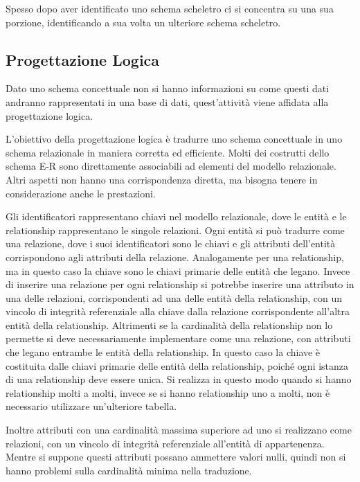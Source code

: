 \documentclass{article}
\numberwithin{equation}{subsection}
\begin{document}
Spesso dopo aver identificato uno schema scheletro ci si concentra su una sua porzione, identificando a sua volta un ulteriore schema scheletro. 

\subsection{Progettazione Logica}

Dato uno schema concettuale non si hanno informazioni su come questi dati andranno rappresentati in una base di dati, quest'attività viene affidata alla progettazione logica. 

L'obiettivo della progettazione logica è tradurre uno schema concettuale in uno schema relazionale in maniera corretta ed efficiente. 
Molti dei costrutti dello schema E-R sono direttamente associabili ad elementi del modello relazionale. 
Altri aspetti non hanno una corrispondenza diretta, ma bisogna tenere in considerazione anche le prestazioni. 

Gli identificatori rappresentano chiavi nel modello relazionale, dove le entità e le relationship rappresentano le singole relazioni. 
Ogni entità si può tradurre come una relazione, dove i suoi identificatori sono le chiavi e gli attributi dell'entità corrispondono agli attributi della relazione. Analogamente per una relationship, ma in questo caso la chiave sono le chiavi primarie delle entità che legano. 
Invece di inserire una relazione per 
ogni relationship si potrebbe inserire una attributo in una delle relazioni, corrispondenti ad una delle entità della relationship, con un vincolo di integrità referenziale alla chiave dalla relazione corrispondente all'altra entità della relationship. Altrimenti se la cardinalità della relationship non lo permette si deve necessariamente implementare come una relazione, con attributi che legano entrambe 
le entità della relationship. In questo caso la chiave è costituita dalle chiavi primarie delle entità della relationship, poiché ogni istanza di una relationship deve essere unica. Si realizza in questo 
modo quando si hanno relationship molti a molti, invece se si hanno relationship uno a molti, non è necessario utilizzare un'ulteriore tabella. 



Inoltre attributi con una cardinalità massima superiore ad uno si realizzano come relazioni, con un vincolo di integrità referenziale all'entità di appartenenza. Mentre si suppone questi attributi possano ammettere valori nulli, quindi non si hanno problemi sulla cardinalità minima nella traduzione. 
\end{document}
